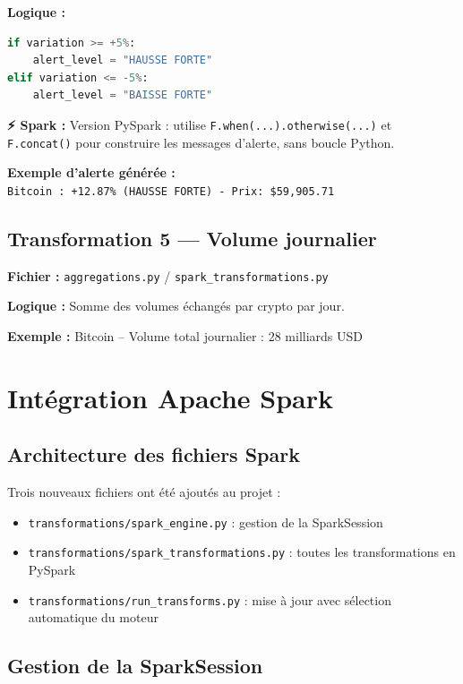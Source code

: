 \documentclass[12pt,a4paper]{article}
\newcommand{\sparkbox}[1]{%
  \vspace{4pt}
  \noindent\colorbox{orange!15}{\parbox{\dimexpr\linewidth-2\fboxsep}{%
    {\color{sparkcolor}\textbf{⚡ Spark :}} #1
  }}
  \vspace{4pt}
}
\begin{document}
\textbf{Logique :}
\begin{lstlisting}[language=Python]
if variation >= +5%:
    alert_level = "HAUSSE FORTE"
elif variation <= -5%:
    alert_level = "BAISSE FORTE"
\end{lstlisting}

\sparkbox{Version PySpark : utilise \texttt{F.when(...).otherwise(...)} et \texttt{F.concat()} pour construire les messages d'alerte, sans boucle Python.}

\textbf{Exemple d'alerte générée :}\\
\texttt{Bitcoin : +12.87\% (HAUSSE FORTE) - Prix: \$59,905.71}

\subsection{Transformation 5 — Volume journalier}
\textbf{Fichier :} \texttt{aggregations.py} / \texttt{spark\_transformations.py}

\textbf{Logique :} Somme des volumes échangés par crypto par jour.

\textbf{Exemple :} Bitcoin -- Volume total journalier : 28 milliards USD

\section{Intégration Apache Spark}

\subsection{Architecture des fichiers Spark}

Trois nouveaux fichiers ont été ajoutés au projet :

\begin{itemize}
    \item \texttt{transformations/spark\_engine.py} : gestion de la SparkSession
    \item \texttt{transformations/spark\_transformations.py} : toutes les transformations en PySpark
    \item \texttt{transformations/run\_transforms.py} : mise à jour avec sélection automatique du moteur
\end{itemize}

\subsection{Gestion de la SparkSession}
\end{document}
